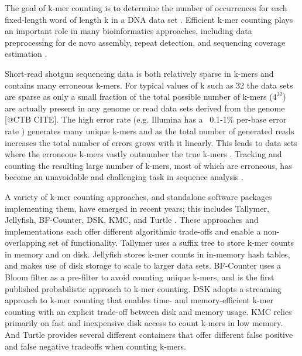 \documentclass{article}
\begin{document}
The goal of k-mer counting is to determine the number of occurrences
for each fixed-length word of length k in a DNA data set
\cite{Marcais2011}. Efficient k-mer counting plays an important role
in many bioinformatics approaches, including data preprocessing for de
novo assembly, repeat detection, and sequencing coverage estimation
\cite{Kurtz2008}.


Short-read shotgun sequencing data is both relatively sparse in
k-mers and contains many erroneous k-mers.  For typical values of k such as 32 the data sets are sparse as only a small fraction of
the total possible number of k-mers ($4^{32}$) are actually present in
any genome or read data sets derived from the genome [@CTB CITE].  The high error rate (e.g. Illumina has a ~0.1-1\%
per-base error rate \cite{pubmed19997069}) generates many unique k-mers and as the total number of generated reads increases the
total number of errors grows with it linearly. This leads to data sets where the
erroneous k-mers vastly outnumber the true k-mers \cite{Conway2011}.
Tracking and counting the resulting large number of k-mers, most of
which are erroneous, has become an unavoidable and challenging task
in sequence analysis
\cite{Minoche2011}.

A variety of k-mer counting approaches, and standalone software
packages implementing them, have emerged in recent years; this
includes Tallymer, Jellyfish, BF-Counter, DSK, KMC, and Turtle \cite{Kurtz2008,Marcais2011, Melsted2011, Rizk2013, Deorowicz2013, Roy2013}.
These
approaches and implementations each offer different algorithmic
trade-offs and enable a non-overlapping set
of functionality.  Tallymer uses a suffix tree to store k-mer counts
in memory and on disk.  Jellyfish stores k-mer counts in in-memory
hash tables, and makes use of disk storage to scale to larger
data sets.  BF-Counter uses a Bloom filter as a pre-filter to avoid
counting unique k-mers, and is the first published probabilistic approach
to k-mer counting.  DSK adopts a streaming approach to k-mer counting that
enables time- and memory-efficient k-mer counting with an explicit
trade-off between disk and memory usage.  KMC relies primarily
on fast and inexpensive disk access to count k-mers in low
memory.  And Turtle provides several different containers that offer
different false positive and false negative tradeoffs when counting k-mers.
\end{document}
